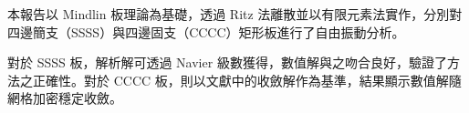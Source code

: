 本報告以 Mindlin 板理論為基礎，透過 Ritz 法離散並以有限元素法實作，分別對四邊簡支（SSSS）與四邊固支（CCCC）矩形板進行了自由振動分析。

對於 SSSS 板，解析解可透過 Navier 級數獲得，數值解與之吻合良好，驗證了方法之正確性。對於 CCCC 板，則以文獻中的收斂解作為基準，結果顯示數值解隨網格加密穩定收斂。

